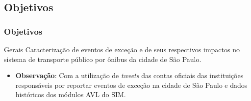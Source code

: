 \documentclass{beamer}
\begin{document}
\subsection{Objetivos}
\begin{frame}
\frametitle{Objetivos}
\begin{block}{Gerais}
Caracterização de eventos de exceção e de seus respectivos impactos no sistema de transporte público por ônibus da cidade de São Paulo.
\begin{itemize}
\item \textbf{Observação}: Com a utilização de \textit{tweets} das contas oficiais das instituições responsáveis por reportar eventos de exceção na cidade de São Paulo e dados históricos dos módulos AVL do SIM.
\end{itemize}
\end{block}
\end{frame}
\end{document}

